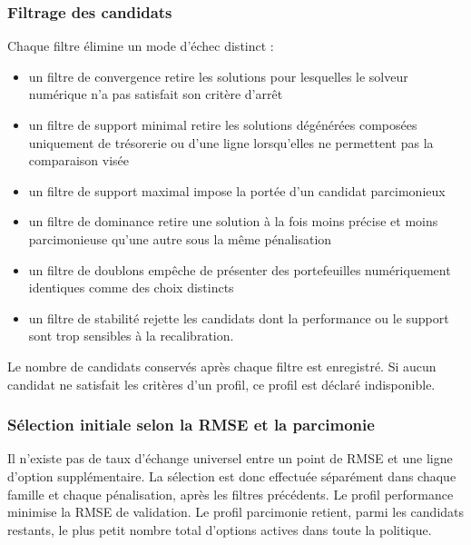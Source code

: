 \documentclass[12pt,a4paper]{article}
\newcommand{\1}{\mathbf{1}}
\begin{document}
\subsubsection*{Filtrage des candidats}

Chaque filtre élimine un mode d'échec distinct :

\begin{itemize}
\item un filtre de convergence retire les solutions pour lesquelles le solveur numérique n'a pas satisfait son critère d'arrêt
\item un filtre de support minimal retire les solutions dégénérées composées uniquement de trésorerie ou d'une ligne lorsqu'elles ne permettent pas la comparaison visée
\item un filtre de support maximal impose la portée d'un candidat parcimonieux
\item un filtre de dominance retire une solution à la fois moins précise et moins parcimonieuse qu'une autre sous la même pénalisation
\item un filtre de doublons empêche de présenter des portefeuilles numériquement identiques comme des choix distincts
\item un filtre de stabilité rejette les candidats dont la performance ou le support sont trop sensibles à la recalibration.
\end{itemize}

Le nombre de candidats conservés après chaque filtre est enregistré. Si aucun
candidat ne satisfait les critères d'un profil, ce profil est déclaré
indisponible.

\subsubsection*{\texorpdfstring{{Sélection initiale selon la RMSE et la parcimonie}}{Sélection initiale selon la RMSE et la parcimonie}}

Il n'existe pas de taux d'échange universel entre un point de RMSE et une ligne
d'option supplémentaire. La sélection est donc effectuée séparément dans chaque
famille et chaque pénalisation, après les filtres précédents. Le profil performance
minimise la RMSE de validation. Le profil parcimonie retient, parmi les candidats
restants, le plus petit nombre total d'options actives dans toute la politique.
\end{document}
